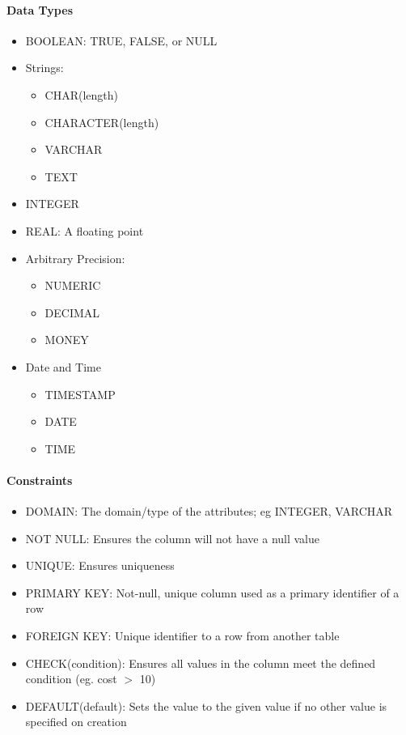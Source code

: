 \paragraph{Data Types}
\begin{itemize}
	\item BOOLEAN: TRUE, FALSE, or NULL
	\item Strings: 
	\begin{itemize}
		\item CHAR(length)
		\item CHARACTER(length)
		\item VARCHAR
		\item TEXT
	\end{itemize}
	\item INTEGER
	\item REAL: A floating point
	\item Arbitrary Precision:
		\begin{itemize}
			\item NUMERIC
			\item DECIMAL
			\item MONEY
		\end{itemize}
	\item Date and Time
		\begin{itemize}
			\item TIMESTAMP
			\item DATE
			\item TIME
		\end{itemize}
\end{itemize}
\paragraph{Constraints}
\begin{itemize}
	\item DOMAIN: The domain/type of the attributes; eg INTEGER, VARCHAR
	\item NOT NULL: Ensures the column will not have a null value
	\item UNIQUE: Ensures uniqueness
	\item PRIMARY KEY: Not-null, unique column used as a primary identifier of a row
	\item FOREIGN KEY: Unique identifier to a row from another table
	\item CHECK(condition): Ensures all values in the column meet the defined condition (eg. cost $>$ 10)
	\item DEFAULT(default): Sets the value to the given value if no other value is specified on creation
\end{itemize}

